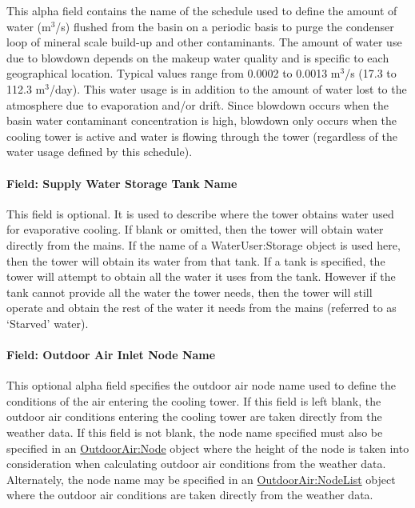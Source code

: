 This alpha field contains the name of the schedule used to define the amount of water (m\(^{3}\)/s) flushed from the basin on a periodic basis to purge the condenser loop of mineral scale build-up and other contaminants. The amount of water use due to blowdown depends on the makeup water quality and is specific to each geographical location. Typical values range from 0.0002 to 0.0013 m\(^{3}\)/s (17.3 to 112.3 m\(^{3}\)/day). This water usage is in addition to the amount of water lost to the atmosphere due to evaporation and/or drift. Since blowdown occurs when the basin water contaminant concentration is high, blowdown only occurs when the cooling tower is active and water is flowing through the tower (regardless of the water usage defined by this schedule).

\paragraph{Field: Supply Water Storage Tank Name}\label{field-supply-water-storage-tank-name-3}

This field is optional. It is used to describe where the tower obtains water used for evaporative cooling. If blank or omitted, then the tower will obtain water directly from the mains. If the name of a WaterUser:Storage object is used here, then the tower will obtain its water from that tank. If a tank is specified, the tower will attempt to obtain all the water it uses from the tank. However if the tank cannot provide all the water the tower needs, then the tower will still operate and obtain the rest of the water it needs from the mains (referred to as `Starved' water).

\paragraph{Field: Outdoor Air Inlet Node Name}\label{field-outdoor-air-inlet-node-name-3}

This optional alpha field specifies the outdoor air node name used to define the conditions of the air entering the cooling tower. If this field is left blank, the outdoor air conditions entering the cooling tower are taken directly from the weather data. If this field is not blank, the node name specified must also be specified in an \hyperref[outdoorairnode]{OutdoorAir:Node} object where the height of the node is taken into consideration when calculating outdoor air conditions from the weather data. Alternately, the node name may be specified in an \hyperref[outdoorairnodelist]{OutdoorAir:NodeList} object where the outdoor air conditions are taken directly from the weather data.

